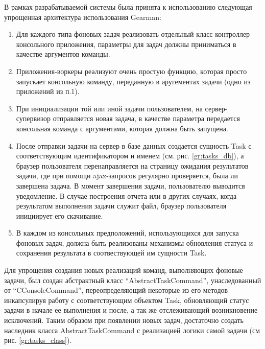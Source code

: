 В рамках разрабатываемой системы была принята к использованию следующая упрощенная архитектура использования
Gearman:
\begin{enumerate}
\item{
  Для каждого типа фоновых задач реализовать отдельный класс-контроллер консольного приложения, параметры 
  для задач должны приниматься в качестве аргументов команды.
}
\item{
  Приложения-воркеры реализуют очень простую функцию, которая просто запускает консольную команду,
   переданную в аругементах задачи (одно из приложений из п.1).
}
\item{
  При инициализации той или иной задачи пользователем, на сервер-супервизор отправляется новая задача,
  в качестве параметра передается консольная команда с аргументами, которая должна быть запущена.
}
\item{
  После отправки задачи на сервер в базе данных создается сущность Task с соответствующим идентификатором
  и именем (см. рис. \ref{gr:tasks_db}), а браузер пользователя перенаправляется на страницу
  ожидания результатов задачи, где при помощи ajax-запросов регулярно проверяется, была ли завершена задача.
  В момент завершения задачи, пользователю выводится уведомление. В случае построения отчета или в других
  случаях, когда результатом выполнения задачи служит файл, браузер пользователя инициирует его скачивание.
}
\item{
  В каждом из консольных предположений, использующихся для запуска фоновых задач, должна быть реализованы
  механизмы обновления статуса и сохранения результата в соотвествующей им сущности Task.
}
\end{enumerate}

Для упрощения создания новых реализаций команд, выполняющих фоновые задачи, был создан абстрактный класс
``AbstractTaskCommand'', унаследованный от ``CConsoleCommand'', переопределяющий некоторые из его методов
инкапсулируя работу с соответствующим объектом Task, обновляющий статус задачи в начале ее выполнения и после,
а так же отслеживающий возникновение исключений.
Таким образом при появлении новых задач, достаточно создать наследник класса AbstractTaskCommand с реализацией
логики самой задачи (см рис. \ref{gr:tasks_class}).

